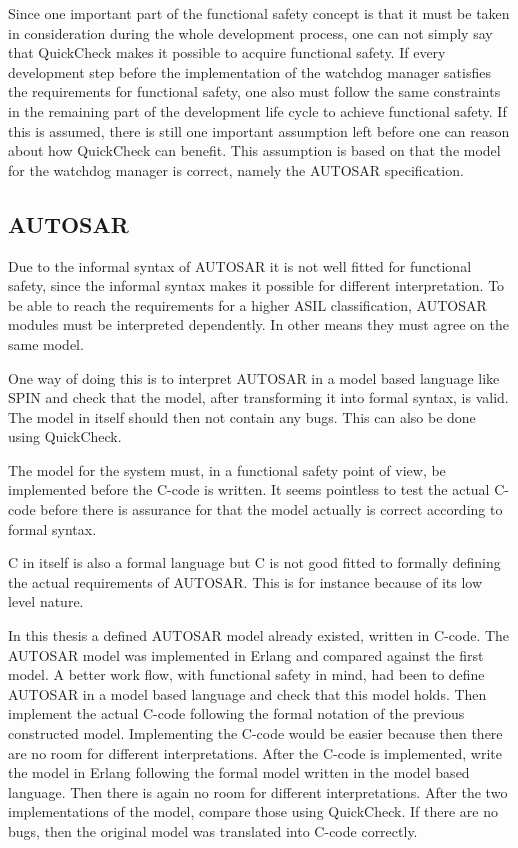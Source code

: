 Since one important part of the functional safety concept is that it
must be taken in consideration during the whole development process,
one can not simply say that QuickCheck makes it possible to acquire
functional safety. If every development step before the implementation
of the watchdog manager satisfies the requirements for functional
safety, one also must follow the same constraints in the remaining
part of the development life cycle to achieve functional safety. If
this is assumed, there is still one important assumption left before
one can reason about how QuickCheck can benefit. This assumption is
based on that the model for the watchdog manager is correct, namely
the AUTOSAR specification.

\subsection{AUTOSAR}
Due to the informal syntax of AUTOSAR it is not well fitted for
functional safety, since the informal syntax makes it possible for
different interpretation. To be able to reach the requirements for a higher
ASIL classification, AUTOSAR modules must be interpreted dependently. In other
means they must agree on the same model.

One way of doing this is to interpret AUTOSAR in a model based
language like SPIN and check that the model, after transforming it
into formal syntax, is valid. The model in itself should then not
contain any bugs. This can also be done using QuickCheck.

The model for the system must, in a functional safety
point of view, be implemented before the C-code is written. It seems
pointless to test the actual C-code before there is assurance for that
the model actually is correct according to formal syntax.

C in itself is also a formal language but C is not good fitted to
formally defining the actual requirements of AUTOSAR. This is for
instance because of its low level nature.

In this thesis a defined AUTOSAR model already existed, written in
C-code. The AUTOSAR model was implemented in Erlang and
compared against the first model. %
A better work flow, with functional safety in mind, had been to define AUTOSAR
in a model based language and check that this model holds. Then implement the
actual C-code following the formal notation of the previous constructed
model. Implementing the C-code would be easier because then there are
no room for different interpretations. After the C-code is
implemented, write the model in Erlang following the formal model
written in the model based language. Then there is again no room for
different interpretations. After the two implementations of the model,
compare those using QuickCheck. If there are no bugs, then the
original model was translated into C-code correctly.

